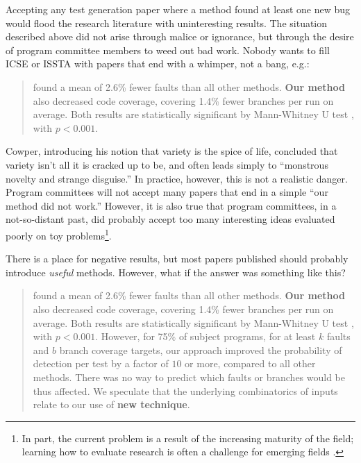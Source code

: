 \documentclass[sigplan,screen]{acmart}
\begin{document}
Accepting any test generation paper where a method found at least one
new bug would flood the research literature with uninteresting
results.  The situation described above did not arise through malice
or ignorance, but through the desire of program committee members to
weed out bad work.  Nobody wants to fill ICSE or ISSTA with papers
that end with a whimper, not a bang, e.g.:

\begin{quote}
 found a mean of 2.6\% fewer faults than all
other methods.  {\bf Our
  method} also decreased code coverage, covering 1.4\% fewer branches
per run on average.  Both results are statistically significant by
Mann-Whitney U test \cite{arcuri2014hitchhiker}, with $p < 0.001$.
\end{quote}

Cowper, introducing his notion that variety is the spice of life,
concluded that variety isn't all it is cracked up to be, and often
leads simply to ``monstrous novelty and strange disguise.''  In
practice, however, this is not a realistic danger.  Program committees
will not accept many papers that end in a simple ``our method did not
work.''  However, it is also true that program committees, in a
not-so-distant past, did probably accept too many interesting ideas
evaluated poorly on toy problems\footnote{In part, the current problem is a
result of the increasing maturity of the field; learning how to evaluate research
is often a challenge for emerging fields \cite{10.1145/1294211.1294256}.}.

There is a place for negative results, but most papers published
should probably introduce \emph{useful} methods.  However, what if the
answer was something like this?

\begin{quote}
 found a mean of 2.6\% fewer faults than all
other methods.  {\bf Our
  method} also decreased code coverage, covering 1.4\% fewer branches
per run on average.  Both results are statistically significant by
Mann-Whitney U test \cite{arcuri2014hitchhiker}, with $p < 0.001$.
However, for 75\% of subject programs, for at least $k$ faults and $b$
branch coverage targets, our approach improved the probability of
detection per test by a factor of $10$ or more, compared to all other
methods.  There was no way to predict which faults or branches would
be thus affected.  We speculate that the underlying combinatorics of
inputs relate to our use of {\bf new technique}.
\end{quote}
\end{document}
